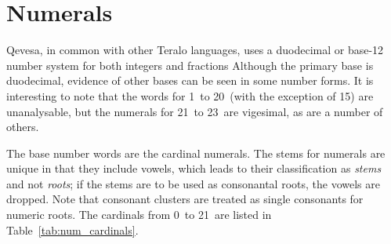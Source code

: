 \documentclass[grammar]{subfiles}
\begin{document}
	\section*{Numerals}
	\label{ch:numerals}

	Qevesa, in common with other Teralo languages, uses a duodecimal or base-12 number system for both integers and fractions Although the primary base is duodecimal, evidence of other bases can be seen in some number forms. It is interesting to note that the words for 1\dec\ to 20\dec\ (with the exception of 15\dec) are unanalysable, but the numerals for 21\dec\ to 23\dec\ are vigesimal\footnotemark{}, as are a number of others.


	The base number words are the cardinal numerals. The stems for numerals are unique in that they include vowels, which leads to their classification as \emph{stems} and not \emph{roots}; if the stems are to be used as consonantal roots, the vowels are dropped. Note that consonant clusters are treated as single consonants for numeric roots. The cardinals from 0\dec\ to 21\dec\ are listed in Table~\ref{tab:num_cardinals}.
\end{document}
